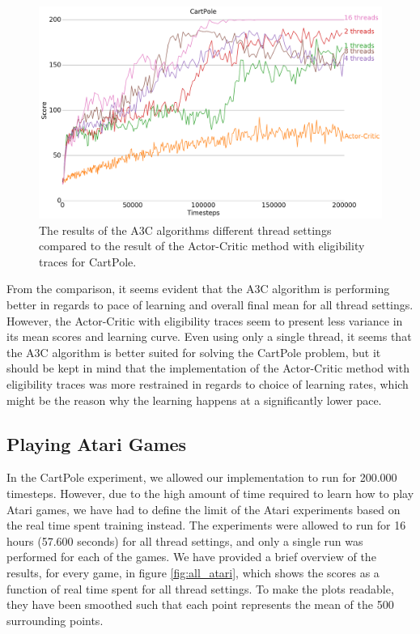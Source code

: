 \documentclass[11pt]{article}
\begin{document}
\begin{figure}[H]
    \centering
    \includegraphics[scale=0.4]{plots/cartpole_compare_counter_with_AC.png}
    \caption{The results of the A3C algorithms different thread
            settings compared to the result of the Actor-Critic method
            with eligibility traces for CartPole.}
    \label{fig:a3c_comp_eligibility}
\end{figure}

From the comparison, it seems evident that the A3C algorithm is performing
better in regards to pace of learning and overall final mean for all thread settings.
However, the Actor-Critic with eligibility traces seem to present less variance
in its mean scores and learning curve.
Even using only a single thread, it seems that the A3C algorithm
is better suited for solving the CartPole problem, but it should
be kept in mind that the implementation of the Actor-Critic method
with eligibility traces was more restrained in regards to choice of
learning rates, which might be the reason why the learning happens
at a significantly lower pace.

\subsection{Playing Atari Games}

In the CartPole experiment, we allowed our implementation to run for 200.000 timesteps.
However, due to the high amount of time required to
learn how to play Atari games, we have had to define the limit of the
Atari experiments based on the real time spent training instead.
The experiments were allowed to run for 16 hours (57.600 seconds)
for all thread settings, and only a single run was performed for
each of the games.
We have provided a brief overview of the results, for every game, in figure \ref{fig:all_atari},
which shows the scores as a function of real time spent for all
thread settings.
To make the plots readable, they have been smoothed such that
each point represents the mean of the 500 surrounding points.
\end{document}
